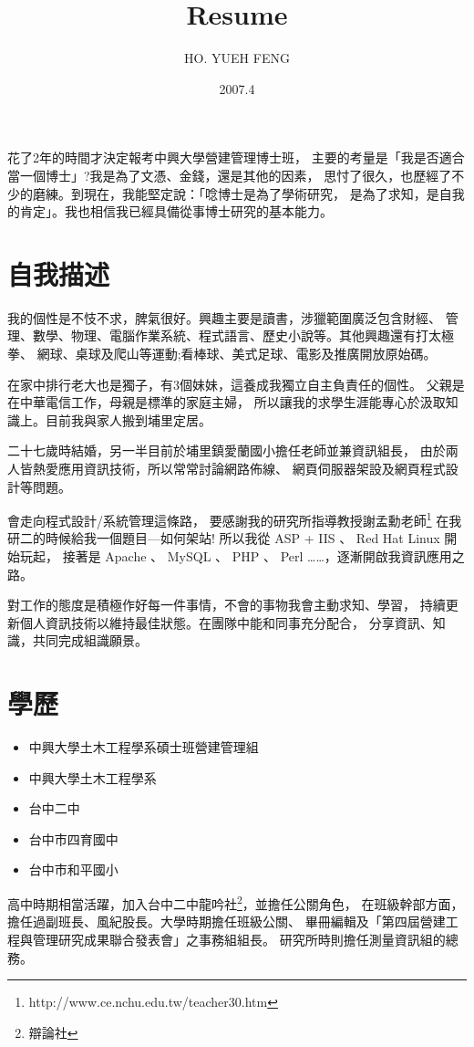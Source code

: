 \documentclass[12pt,a4paper]{article}
\title{Resume}
\author{HO. YUEH FENG}
\date{2007.4}
\begin{document}
\begin{CJK}{UTF8}{bsmi}
    \maketitle
    \fontsize{14pt}{0.8cm}\selectfont
	花了2年的時間才決定報考中興大學營建管理博士班，%
	主要的考量是「我是否適合當一個博士」?我是為了文憑、金錢，還是其他的因素，%
	思忖了很久，也歷經了不少的磨練。到現在，我能堅定說：「唸博士是為了學術研究，%
	是為了求知，是自我的肯定」。我也相信我已經具備從事博士研究的基本能力。	
    \section{自我描述}
    我的個性是不忮不求，脾氣很好。興趣主要是讀書，涉獵範圍廣泛包含財經、%
    管理、數學、物理、電腦作業系統、程式語言、歷史小說等。其他興趣還有打太極拳、%
    網球、桌球及爬山等運動;看棒球、美式足球、電影及推廣開放原始碼。

    在家中排行老大也是獨子，有3個妹妹，這養成我獨立自主負責任的個性。%
    父親是在中華電信工作，母親是標準的家庭主婦，%
    所以讓我的求學生涯能專心於汲取知識上。目前我與家人搬到埔里定居。

    二十七歲時結婚，另一半目前於埔里鎮愛蘭國小擔任老師並兼資訊組長，%
    由於兩人皆熱愛應用資訊技術，所以常常討論網路佈線、%
    網頁伺服器架設及網頁程式設計等問題。

    會走向程式設計/系統管理這條路，%
    要感謝我的研究所指導教授謝孟勳老師\footnote{http://www.ce.nchu.edu.tw/teacher30.htm}%
    在我研二的時候給我一個題目---如何架站!%
    所以我從 ASP + IIS 、 Red Hat Linux 開始玩起，%
    接著是 Apache 、 MySQL 、 PHP 、 Perl ……，逐漸開啟我資訊應用之路。

    對工作的態度是積極作好每一件事情，不會的事物我會主動求知、學習，%
    持續更新個人資訊技術以維持最佳狀態。在團隊中能和同事充分配合，%
    分享資訊、知識，共同完成組識願景。
    \section{學歷}
    \begin{itemize}
        \item 中興大學土木工程學系碩士班營建管理組
        \item 中興大學土木工程學系
        \item 台中二中
        \item 台中市四育國中
        \item 台中市和平國小
    \end{itemize}
    高中時期相當活躍，加入台中二中龍吟社\footnote{辯論社}，並擔任公關角色，%
    在班級幹部方面，擔任過副班長、風紀股長。大學時期擔任班級公關、%
    畢冊編輯及「第四屆營建工程與管理研究成果聯合發表會」之事務組組長。%
    研究所時則擔任測量資訊組的總務。


\end{CJK}
\end{document}

